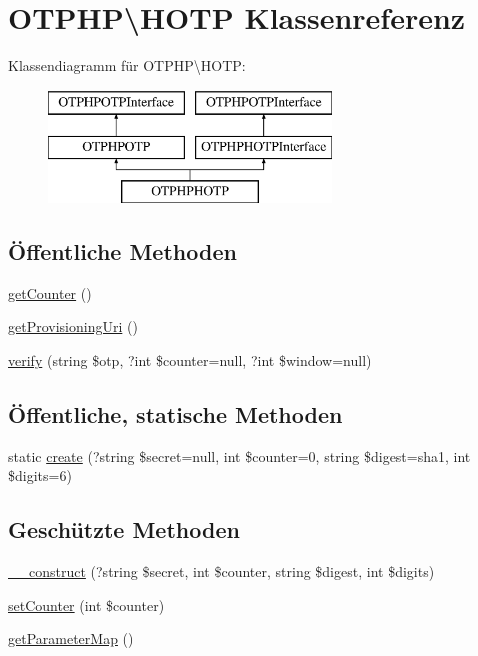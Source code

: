 \hypertarget{class_o_t_p_h_p_1_1_h_o_t_p}{}\section{O\+T\+P\+HP\textbackslash{}H\+O\+TP Klassenreferenz}
\label{class_o_t_p_h_p_1_1_h_o_t_p}
Klassendiagramm für O\+T\+P\+HP\textbackslash{}H\+O\+TP\+:\begin{figure}[H]
\begin{center}
\leavevmode
\includegraphics[height=3.000000cm]{class_o_t_p_h_p_1_1_h_o_t_p}
\end{center}
\end{figure}
\subsection*{Öffentliche Methoden}
\begin{DoxyCompactItemize}
\item 
\mbox{\hyperlink{class_o_t_p_h_p_1_1_h_o_t_p_a523cedac7ed950276daa4884fbb63230}{get\+Counter}} ()
\item 
\mbox{\hyperlink{class_o_t_p_h_p_1_1_h_o_t_p_a468b545132d70bd82e48806243bd2269}{get\+Provisioning\+Uri}} ()
\item 
\mbox{\hyperlink{class_o_t_p_h_p_1_1_h_o_t_p_a9d72e9295aa6f1e7df15a1abfef96683}{verify}} (string \$otp, ?int \$counter=null, ?int \$window=null)
\end{DoxyCompactItemize}
\subsection*{Öffentliche, statische Methoden}
\begin{DoxyCompactItemize}
\item 
static \mbox{\hyperlink{class_o_t_p_h_p_1_1_h_o_t_p_a3222b6577c62651140be29bff9701c9d}{create}} (?string \$secret=null, int \$counter=0, string \$digest=\textquotesingle{}sha1\textquotesingle{}, int \$digits=6)
\end{DoxyCompactItemize}
\subsection*{Geschützte Methoden}
\begin{DoxyCompactItemize}
\item 
\mbox{\hyperlink{class_o_t_p_h_p_1_1_h_o_t_p_ab254f15899f21f5bf56b217182e8670e}{\+\_\+\+\_\+construct}} (?string \$secret, int \$counter, string \$digest, int \$digits)
\item 
\mbox{\hyperlink{class_o_t_p_h_p_1_1_h_o_t_p_a2928f5f41646e545b4b93d82e3cc955e}{set\+Counter}} (int \$counter)
\item 
\mbox{\hyperlink{class_o_t_p_h_p_1_1_h_o_t_p_abbff46cff0f5e15fe70a1b25065aa1e6}{get\+Parameter\+Map}} ()
\end{DoxyCompactItemize}



